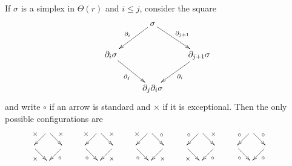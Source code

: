 	\begin{lemma} If $\sigma$ is a simplex in $\Theta(r)$ and $i\leq j$, consider the square
		\[\xymatrix @=2pc{
			&\sigma \ar[dl]_{\partial_i}\ar[dr]^{\partial_{j+1}} &\\
			\partial_i\sigma\ar[dr]_{\partial_j} && \partial_{j+1}\sigma\ar[dl]^{\partial_i}\\
			&\partial_j\partial_{i}\sigma &
		}\]
		and write $\circ$ if an arrow is standard and $\times$ if it is exceptional. Then the only possible configurations are
		\[\xymatrix @=1pc{
			&\ar[dl]_{\times} \ar[dr]^{\times}&& \\
			\ar[dr]_{\times} && \ar[dl]^{\circ} \\
			&&
		}
		\xymatrix @=1pc{
			&\ar[dl]_{\times} \ar[dr]^{\times}&& \\
			\ar[dr]_{\circ} && \ar[dl]^{\times} \\
			&&
		}
		\xymatrix @=1pc{
			&\ar[dl]_{\times} \ar[dr]^{\circ}&& \\
			\ar[dr]_{\circ} && \ar[dl]^{\times} \\
			&&
		}
		\xymatrix @=1pc{
			&\ar[dl]_{\circ} \ar[dr]^{\times}&& \\
			\ar[dr]_{\times} && \ar[dl]^{\circ} \\
			&&
		}
		\xymatrix @=1pc{
			&\ar[dl]_{\circ} \ar[dr]^{\circ}&& \\
			\ar[dr]_{\circ} && \ar[dl]^{\circ} \\
			&&
		}
		\]






\end{lemma}
